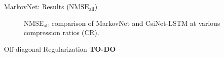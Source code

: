 \documentclass{beamer}
\begin{document}
  \begin{frame}{MarkovNet: Results ($\text{NMSE}_{\text{all}}$)}
    \begin{figure}[!hbtp] \centering 
      \vspace*{-3mm}
      \caption{$\text{NMSE}_{\text{all}}$ comparison of MarkovNet and CsiNet-LSTM 
      at various compression ratios (CR).} 
      \label{fig:diffnet_result} \vspace*{-2mm}
    \end{figure}  
  \end{frame}

  \begin{frame}{Off-diagonal Regularization}
  \textbf{TO-DO}
  \end{frame}
\end{document}
